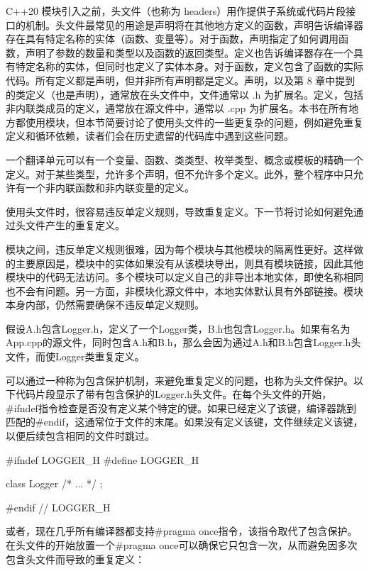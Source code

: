 
C++20 模块引入之前，头文件（也称为 headers）用作提供子系统或代码片段接口的机制。头文件最常见的用途是声明将在其他地方定义的函数，声明告诉编译器存在具有特定名称的实体（函数、变量等）。对于函数，声明指定了如何调用函数，声明了参数的数量和类型以及函数的返回类型。定义也告诉编译器存在一个具有特定名称的实体，但同时也定义了实体本身。对于函数，定义包含了函数的实际代码。所有定义都是声明，但并非所有声明都是定义。声明，以及第 8 章中提到的类定义（也是声明），通常放在头文件中，文件通常以 .h 为扩展名。定义，包括非内联类成员的定义，通常放在源文件中，通常以 .cpp 为扩展名。本书在所有地方都使用模块，但本节简要讨论了使用头文件的一些更复杂的问题，例如避免重复定义和循环依赖，读者们会在历史遗留的代码库中遇到这些问题。


一个翻译单元可以有一个变量、函数、类类型、枚举类型、概念或模板的精确一个定义。对于某些类型，允许多个声明，但不允许多个定义。此外，整个程序中只允许有一个非内联函数和非内联变量的定义。

使用头文件时，很容易违反单定义规则，导致重复定义。下一节将讨论如何避免通过头文件产生的重复定义。

模块之间，违反单定义规则很难，因为每个模块与其他模块的隔离性更好。这样做的主要原因是，模块中的实体如果没有从该模块导出，则具有模块链接，因此其他模块中的代码无法访问。多个模块可以定义自己的非导出本地实体，即使名称相同也不会有问题。另一方面，非模块化源文件中，本地实体默认具有外部链接。模块本身内部，仍然需要确保不违反单定义规则。


假设A.h包含Logger.h，定义了一个Logger类，B.h也包含Logger.h。如果有名为App.cpp的源文件，同时包含A.h和B.h，那么会因为通过A.h和B.h包含Logger.h头文件，而使Logger类重复定义。

可以通过一种称为包含保护机制，来避免重复定义的问题，也称为头文件保护。以下代码片段显示了带有包含保护的Logger.h头文件。在每个头文件的开始，\#ifndef指令检查是否没有定义某个特定的键。如果已经定义了该键，编译器跳到匹配的\#endif，这通常位于文件的末尾。如果没有定义该键，文件继续定义该键，以便后续包含相同的文件时跳过。

\begin{cpp}
#ifndef LOGGER_H
#define LOGGER_H

class Logger { /* ... */ };

#endif // LOGGER_H
\end{cpp}

或者，现在几乎所有编译器都支持\#pragma once指令，该指令取代了包含保护。在头文件的开始放置一个\#pragma once可以确保它只包含一次，从而避免因多次包含头文件而导致的重复定义：

